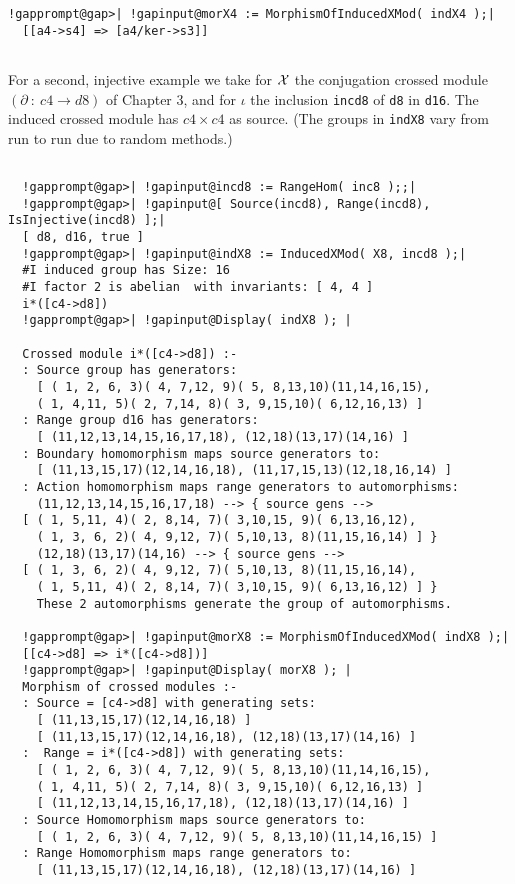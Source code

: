 \documentclass[a4paper,11pt]{report}
\begin{document}
{{\begin{Verbatim}[commandchars=!@|,fontsize=\small,frame=single,label=Example]
  !gapprompt@gap>| !gapinput@morX4 := MorphismOfInducedXMod( indX4 );|
  [[a4->s4] => [a4/ker->s3]]
  
\end{Verbatim}
 For a second, injective example we take for ${\cal X}$ the conjugation crossed module $(\partial ~:~ c4 \to d8)$ of Chapter 3, and for $\iota$ the inclusion \texttt{incd8} of \texttt{d8} in \texttt{d16}. The induced crossed module has $c4 \times c4$ as source. (The groups in \texttt{indX8} vary from run to run due to random methods.) 
\begin{Verbatim}[commandchars=!@|,fontsize=\small,frame=single,label=Example]
  
  !gapprompt@gap>| !gapinput@incd8 := RangeHom( inc8 );;|
  !gapprompt@gap>| !gapinput@[ Source(incd8), Range(incd8), IsInjective(incd8) ];|
  [ d8, d16, true ]
  !gapprompt@gap>| !gapinput@indX8 := InducedXMod( X8, incd8 );|
  #I induced group has Size: 16
  #I factor 2 is abelian  with invariants: [ 4, 4 ]
  i*([c4->d8])
  !gapprompt@gap>| !gapinput@Display( indX8 ); |
  
  Crossed module i*([c4->d8]) :- 
  : Source group has generators:
    [ ( 1, 2, 6, 3)( 4, 7,12, 9)( 5, 8,13,10)(11,14,16,15), 
    ( 1, 4,11, 5)( 2, 7,14, 8)( 3, 9,15,10)( 6,12,16,13) ]
  : Range group d16 has generators:
    [ (11,12,13,14,15,16,17,18), (12,18)(13,17)(14,16) ]
  : Boundary homomorphism maps source generators to:
    [ (11,13,15,17)(12,14,16,18), (11,17,15,13)(12,18,16,14) ]
  : Action homomorphism maps range generators to automorphisms:
    (11,12,13,14,15,16,17,18) --> { source gens --> 
  [ ( 1, 5,11, 4)( 2, 8,14, 7)( 3,10,15, 9)( 6,13,16,12), 
    ( 1, 3, 6, 2)( 4, 9,12, 7)( 5,10,13, 8)(11,15,16,14) ] }
    (12,18)(13,17)(14,16) --> { source gens --> 
  [ ( 1, 3, 6, 2)( 4, 9,12, 7)( 5,10,13, 8)(11,15,16,14), 
    ( 1, 5,11, 4)( 2, 8,14, 7)( 3,10,15, 9)( 6,13,16,12) ] }
    These 2 automorphisms generate the group of automorphisms.
  
  !gapprompt@gap>| !gapinput@morX8 := MorphismOfInducedXMod( indX8 );|
  [[c4->d8] => i*([c4->d8])]
  !gapprompt@gap>| !gapinput@Display( morX8 ); |
  Morphism of crossed modules :- 
  : Source = [c4->d8] with generating sets:
    [ (11,13,15,17)(12,14,16,18) ]
    [ (11,13,15,17)(12,14,16,18), (12,18)(13,17)(14,16) ]
  :  Range = i*([c4->d8]) with generating sets:
    [ ( 1, 2, 6, 3)( 4, 7,12, 9)( 5, 8,13,10)(11,14,16,15), 
    ( 1, 4,11, 5)( 2, 7,14, 8)( 3, 9,15,10)( 6,12,16,13) ]
    [ (11,12,13,14,15,16,17,18), (12,18)(13,17)(14,16) ]
  : Source Homomorphism maps source generators to:
    [ ( 1, 2, 6, 3)( 4, 7,12, 9)( 5, 8,13,10)(11,14,16,15) ]
  : Range Homomorphism maps range generators to:
    [ (11,13,15,17)(12,14,16,18), (12,18)(13,17)(14,16) ]
  

\end{Verbatim}}}
\end{document}
